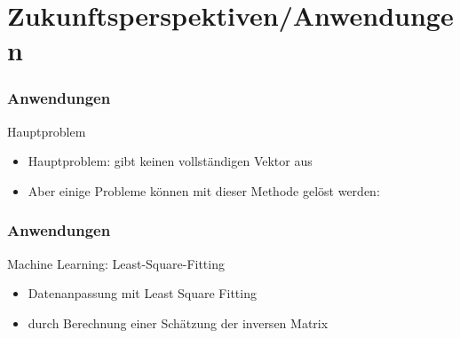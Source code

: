 \section{Zukunftsperspektiven/Anwendungen}

\begin{frame}
    \frametitle{Anwendungen}

    Hauptproblem
    \begin{itemize}
        \item Hauptproblem: gibt keinen vollständigen Vektor aus
        \item Aber einige Probleme können mit dieser Methode gelöst werden:
    \end{itemize}
    
\end{frame}

\begin{frame}
    \frametitle{Anwendungen}


    Machine Learning: Least-Square-Fitting
    \begin{itemize}
        \item Datenanpassung mit Least Square Fitting
        \item durch Berechnung einer Schätzung der inversen Matrix
    \end{itemize}

   \hfil



\end{frame}

